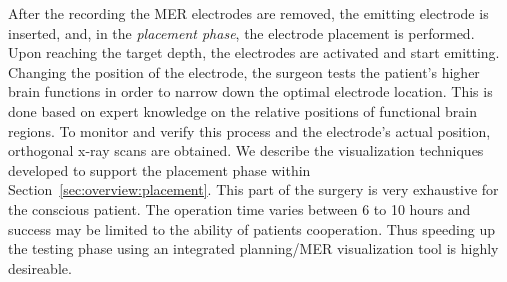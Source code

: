 \documentclass[review]{vgtc}                 %
\begin{document}
After the recording the MER electrodes are removed, the emitting electrode is inserted, and, in the \emph{placement phase},  the electrode placement is performed. Upon reaching the target depth, the electrodes are activated and start emitting. Changing the position of the electrode, the surgeon tests the patient's higher brain functions in order to narrow down the optimal electrode location. This is done based on expert knowledge on the relative positions of functional brain regions. To monitor and verify this process and the electrode's actual position, orthogonal x-ray scans are obtained. We describe the visualization techniques developed to support the placement phase within Section~\ref{sec:overview:placement}. This part of the surgery is very exhaustive for the conscious patient.  The operation time varies between 6 to 10 hours and success may be limited to the ability of patients cooperation. Thus speeding up the testing phase using an integrated planning/MER visualization tool is highly desireable.

\end{document}
